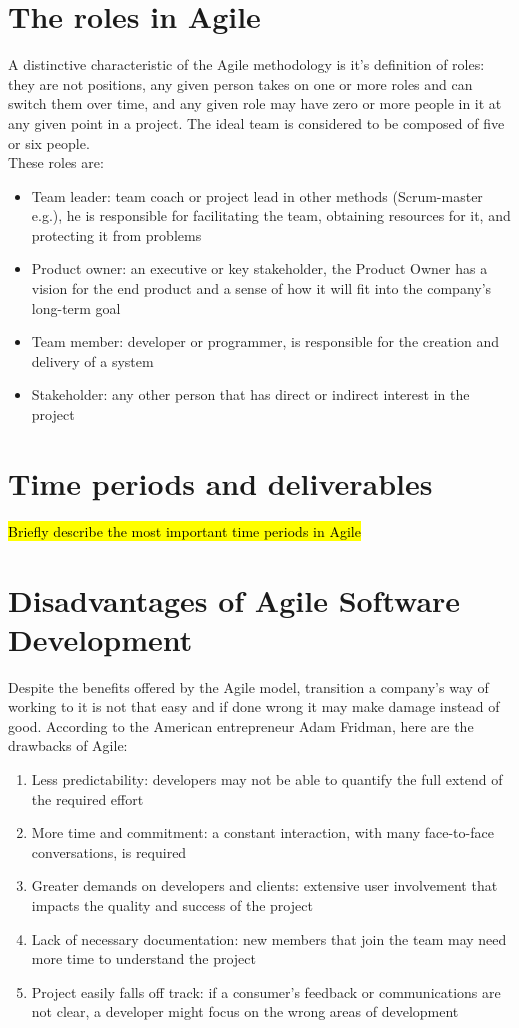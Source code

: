 \section{The roles in Agile}
	A distinctive characteristic of the Agile methodology is it's definition of roles: they are not positions, any given person takes on one or more roles and can switch them over time, and any given role may have zero or more people in it at any given point in a project\cite{agileRoles}.
	The ideal team is considered to be composed of five or six people.\\
	These roles are:
	\begin{itemize}
		\item Team leader: team coach or project lead in other methods (Scrum-master e.g.), he is responsible for facilitating the team, obtaining resources for it, and protecting it from problems
		\item Product owner: an executive or key stakeholder, the Product Owner has a vision for the end product and a sense of how it will fit into the company’s long-term goal
		\item Team member: developer or programmer, is responsible for the creation and delivery of a system
		\item Stakeholder: any other person that has direct or indirect interest in the project
	\end{itemize}

\section{Time periods and deliverables}
\hl{Briefly describe the most important time periods in Agile}

\section{Disadvantages of Agile Software Development}
	Despite the benefits offered by the Agile model, transition a company's way of working to it is not that easy and if done wrong it may make damage instead of good.
	According to the American entrepreneur Adam Fridman, here are the drawbacks\cite{massive-downside-of-agile} of Agile:
	\begin{enumerate}
		\item Less predictability: developers may not be able to quantify the full extend of the required effort
		\item More time and commitment: a constant interaction, with many face-to-face conversations, is required
		\item Greater demands on developers and clients: extensive user involvement that impacts the quality and success of the project
		\item Lack of necessary documentation: new members that join the team may need more time to understand the project
		\item Project easily falls off track: if a consumer's feedback or communications are not clear, a developer might focus on the wrong areas of development
	\end{enumerate}
	
